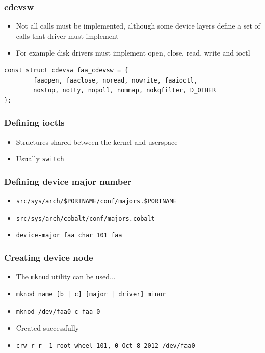 \documentclass[dvipsnames,table]{beamer}
\begin{document}
\begin{frame}[fragile]
\frametitle{cdevsw}
\begin{itemize}
	\item Not all calls must be implemented, although some device layers define a set of calls that driver must implement
	\item For example disk drivers must implement open, close, read, write and ioctl
\end{itemize}
\begin{lstlisting}
const struct cdevsw faa_cdevsw = {
        faaopen, faaclose, noread, nowrite, faaioctl,
        nostop, notty, nopoll, nommap, nokqfilter, D_OTHER
};
\end{lstlisting}
\end{frame}

\begin{frame}
\frametitle{Defining ioctls}
\begin{itemize}
	\item Structures shared between the kernel and userspace
	\item Usually {\tt switch}
\end{itemize}
\end{frame}


\begin{frame}
\frametitle{Defining device major number}
\begin{itemize}
	\item {\tt src/sys/arch/\$PORTNAME/conf/majors.\$PORTNAME}
	\item {\tt src/sys/arch/cobalt/conf/majors.cobalt}
	\item {\tt device-major faa char 101 faa}
\end{itemize}
\end{frame}

\begin{frame}
\frametitle{Creating device node}
\begin{itemize}
	\item The {\tt mknod} utility can be used...
	\item {\tt mknod name [b | c] [major | driver] minor}
	\item {\tt mknod /dev/faa0 c faa 0}
	\item Created successfully
	\scriptsize
	\item {\tt crw-r--r--  1 root  wheel  101, 0 Oct  8  2012 /dev/faa0}
	\normalsize
\end{itemize}
\end{frame}
\end{document}
